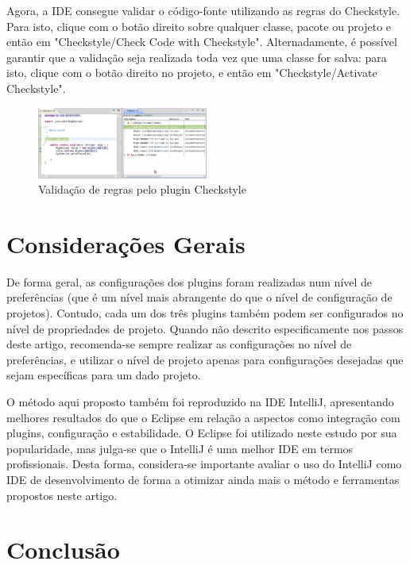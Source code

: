 \documentclass[12pt,journal,compsoc]{IEEEtran}
\begin{document}
Agora, a IDE consegue validar o código-fonte utilizando as regras do Checkstyle. Para isto, clique com o botão direito sobre qualquer classe, pacote ou projeto e então em "Checkstyle/Check Code with Checkstyle". Alternadamente, é possível garantir que a validação seja realizada toda vez que uma classe for salva: para isto, clique com o botão direito no projeto, e então em "Checkstyle/Activate Checkstyle".

\begin{figure}[ht!]
\centering
\includegraphics[width=0.5\textwidth]{img/eclipse-checkstyle-02}
\caption{Validação de regras pelo plugin Checkstyle}
\label{eclipse-checkstyle-02}
\end{figure}

\section{Considerações Gerais}

De forma geral, as configurações dos plugins foram realizadas num nível de preferências (que é um nível mais abrangente do que o nível de configuração de projetos). Contudo, cada um dos três plugins também podem ser configurados no nível de propriedades de projeto. Quando não descrito especificamente nos passos deste artigo, recomenda-se sempre realizar as configurações no nível de preferências, e utilizar o nível de projeto apenas para configurações desejadas que sejam específicas para um dado projeto.

O método aqui proposto também foi reproduzido na IDE IntelliJ, apresentando melhores resultados do que o Eclipse em relação a aspectos como integração com plugins, configuração e estabilidade. O Eclipse foi utilizado neste estudo por sua popularidade, mas julga-se que o IntelliJ é uma melhor IDE em termos profissionais. Desta forma, considera-se importante avaliar o uso do IntelliJ como IDE de desenvolvimento de forma a otimizar ainda mais o método e ferramentas propostos neste artigo.


\section{Conclusão}
\end{document}
